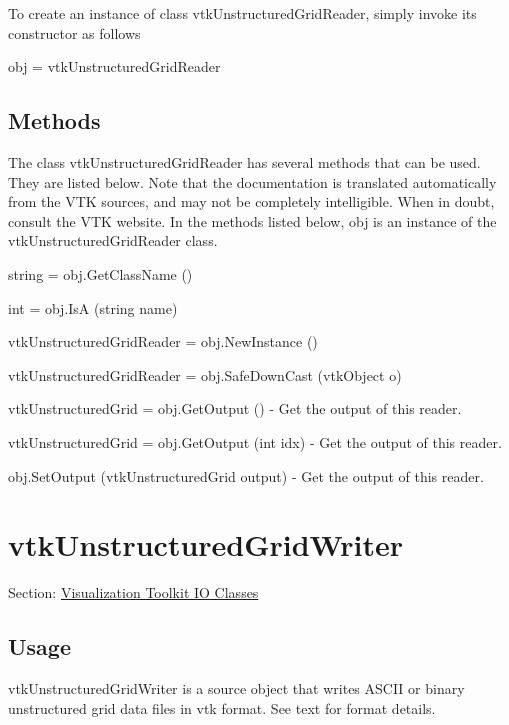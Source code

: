 To create an instance of class vtk\-Unstructured\-Grid\-Reader, simply invoke its constructor as follows \begin{DoxyVerb}  obj = vtkUnstructuredGridReader
\end{DoxyVerb}
 \hypertarget{vtkwidgets_vtkxyplotwidget_Methods}{}\subsection{Methods}\label{vtkwidgets_vtkxyplotwidget_Methods}
The class vtk\-Unstructured\-Grid\-Reader has several methods that can be used. They are listed below. Note that the documentation is translated automatically from the V\-T\-K sources, and may not be completely intelligible. When in doubt, consult the V\-T\-K website. In the methods listed below, {\ttfamily obj} is an instance of the vtk\-Unstructured\-Grid\-Reader class. 
\begin{DoxyItemize}
\item {\ttfamily string = obj.\-Get\-Class\-Name ()}  
\item {\ttfamily int = obj.\-Is\-A (string name)}  
\item {\ttfamily vtk\-Unstructured\-Grid\-Reader = obj.\-New\-Instance ()}  
\item {\ttfamily vtk\-Unstructured\-Grid\-Reader = obj.\-Safe\-Down\-Cast (vtk\-Object o)}  
\item {\ttfamily vtk\-Unstructured\-Grid = obj.\-Get\-Output ()} -\/ Get the output of this reader.  
\item {\ttfamily vtk\-Unstructured\-Grid = obj.\-Get\-Output (int idx)} -\/ Get the output of this reader.  
\item {\ttfamily obj.\-Set\-Output (vtk\-Unstructured\-Grid output)} -\/ Get the output of this reader.  
\end{DoxyItemize}\hypertarget{vtkio_vtkunstructuredgridwriter}{}\section{vtk\-Unstructured\-Grid\-Writer}\label{vtkio_vtkunstructuredgridwriter}
Section\-: \hyperlink{sec_vtkio}{Visualization Toolkit I\-O Classes} \hypertarget{vtkwidgets_vtkxyplotwidget_Usage}{}\subsection{Usage}\label{vtkwidgets_vtkxyplotwidget_Usage}
vtk\-Unstructured\-Grid\-Writer is a source object that writes A\-S\-C\-I\-I or binary unstructured grid data files in vtk format. See text for format details.

